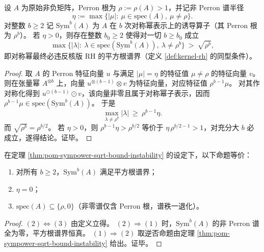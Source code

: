 \begin{theorem}\label{thm:pom-sympower-sqrt-bound-instability}
设 \(A\) 为原始非负矩阵，Perron 根为 \(\rho:=\rho(A)>1\)，并记非 Perron 谱半径
\[
\eta:=\max\bigl\{|\mu|:\ \mu\in\mathrm{spec}(A),\ \mu\ne \rho\bigr\}.
\]
对整数 \(b\ge 2\) 记 \(\mathrm{Sym}^b(A)\) 为 \(A\) 在 \(b\) 次对称幂表示上的诱导算子（其 Perron 根为 \(\rho^b\)）。
若 \(\eta>0\)，则存在整数 \(b_0\ge 2\) 使得对一切 \(b\ge b_0\) 成立
\[
\max\bigl\{|\lambda|:\ \lambda\in\mathrm{spec}(\mathrm{Sym}^b(A)),\ \lambda\ne\rho^b\bigr\}\ >\ \sqrt{\rho^b},
\]
即对称幂最终必违反核版 RH 的平方根谱界（定义 \ref{def:kernel-rh} 的同型条件）。
\end{theorem}
\begin{proof}
取 \(A\) 的 Perron 特征向量 \(u\) 与满足 \(|\mu|=\eta\) 的特征值 \(\mu\ne\rho\) 的特征向量 \(v\)。
则在张量幂 \(A^{\otimes b}\) 上，向量 \(u^{\otimes(b-1)}\otimes v\) 为特征向量，对应特征值 \(\rho^{b-1}\mu\)。
对其作对称化得到 \(u^{\odot(b-1)}\odot v\)，该向量非零且属于对称幂子表示，因而
\(\rho^{b-1}\mu\in\mathrm{spec}(\mathrm{Sym}^b(A))\)。
于是
\[
\max_{\lambda\ne\rho^b}|\lambda|\ \ge\ \rho^{b-1}\eta.
\]
而 \(\sqrt{\rho^b}=\rho^{b/2}\)。
若 \(\eta>0\)，则 \(\rho^{b-1}\eta>\rho^{b/2}\) 等价于 \(\eta\,\rho^{b/2-1}>1\)，对充分大 \(b\) 必成立，遂得结论。证毕。
\end{proof}

\begin{corollary}\label{cor:pom-sympower-sqrt-bound-stable-iff-spectral-rankone}
在定理 \ref{thm:pom-sympower-sqrt-bound-instability} 的设定下，以下命题等价：
\begin{enumerate}
  \item 对所有 \(b\ge 2\)，\(\mathrm{Sym}^b(A)\) 满足平方根谱界；
  \item \(\eta=0\)；
  \item \(\mathrm{spec}(A)\subseteq\{\rho,0\}\)（非零谱仅含 Perron 根，谱秩一退化）。
\end{enumerate}
\end{corollary}
\begin{proof}
\((2)\Leftrightarrow(3)\) 由定义立得。
\((2)\Rightarrow(1)\) 时，\(\mathrm{Sym}^b(A)\) 的非 Perron 谱全为零，平方根谱界恒真。
\((1)\Rightarrow(2)\) 取逆否命题由定理 \ref{thm:pom-sympower-sqrt-bound-instability} 给出。证毕。
\end{proof}


